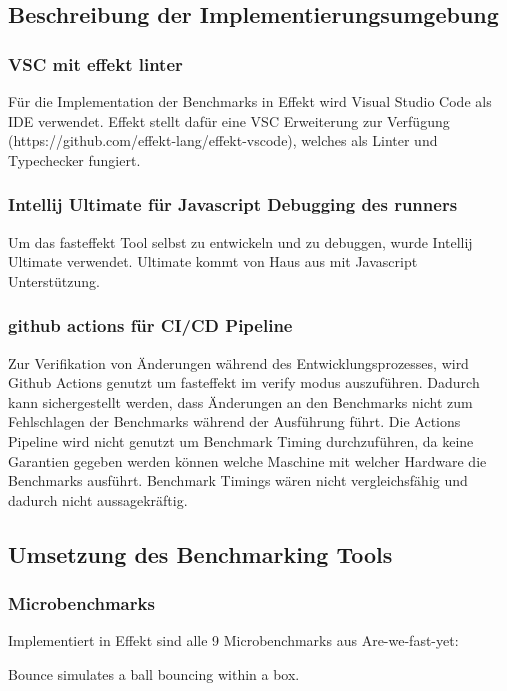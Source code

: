 
\subsection{Beschreibung der Implementierungsumgebung}

\subsubsection{VSC mit effekt linter}

Für die Implementation der Benchmarks in Effekt wird Visual Studio Code als IDE verwendet.
Effekt stellt dafür eine VSC Erweiterung zur Verfügung (https://github.com/effekt-lang/effekt-vscode), welches als Linter und Typechecker fungiert. 

\subsubsection{Intellij Ultimate für Javascript Debugging des runners}
Um das fasteffekt Tool selbst zu entwickeln und zu debuggen, wurde Intellij Ultimate verwendet. Ultimate kommt von Haus aus mit Javascript Unterstützung.

\subsubsection{github actions für CI/CD Pipeline}
Zur Verifikation von Änderungen während des Entwicklungsprozesses, wird Github Actions genutzt um fasteffekt im verify modus auszuführen. Dadurch kann sichergestellt werden, dass Änderungen an den Benchmarks nicht zum Fehlschlagen der Benchmarks während der Ausführung führt. Die Actions Pipeline wird nicht genutzt um Benchmark Timing durchzuführen, da keine Garantien gegeben werden können welche Maschine mit welcher Hardware die Benchmarks ausführt. Benchmark Timings wären nicht vergleichsfähig und dadurch nicht aussagekräftig.
    
\subsection{ Umsetzung des Benchmarking Tools } 
\subsubsection{ Microbenchmarks }
Implementiert in Effekt sind alle 9 Microbenchmarks aus Are-we-fast-yet:

Bounce simulates a ball bouncing within a box.

